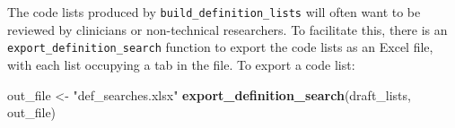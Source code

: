 \documentclass[]{article}
\newenvironment{Shaded}{\begin{snugshade}}{\end{snugshade}}
\newcommand{\KeywordTok}[1]{\textcolor[rgb]{0.13,0.29,0.53}{\textbf{{#1}}}}
\newcommand{\StringTok}[1]{\textcolor[rgb]{0.31,0.60,0.02}{{#1}}}
\newcommand{\NormalTok}[1]{{#1}}
\begin{document}
The code lists produced by \texttt{build\_definition\_lists} will often
want to be reviewed by clinicians or non-technical researchers. To
facilitate this, there is an \texttt{export\_definition\_search}
function to export the code lists as an Excel file, with each list
occupying a tab in the file. To export a code list:

\begin{Shaded}
\begin{Highlighting}[]
\NormalTok{out_file <-}\StringTok{ "def_searches.xlsx"}
\KeywordTok{export_definition_search}\NormalTok{(draft_lists, out_file)}
\end{Highlighting}
\end{Shaded}
\end{document}
